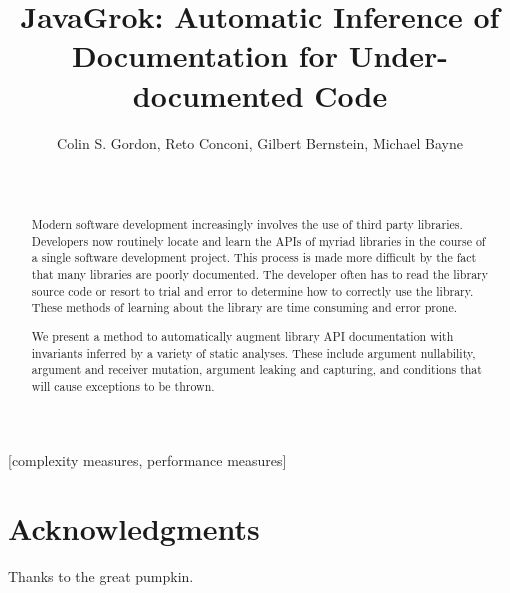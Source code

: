 \documentclass{sig-alternate}
\begin{document}

\title{JavaGrok: Automatic Inference of Documentation for Under-documented Code}

\author{
\alignauthor
Colin S. Gordon, Reto Conconi, Gilbert Bernstein, Michael Bayne\\
       \\
       \\
}

\maketitle
\begin{abstract}
Modern software development increasingly involves the use of third party
libraries. Developers now routinely locate and learn the APIs of myriad
libraries in the course of a single software development project. This process
is made more difficult by the fact that many libraries are poorly documented.
The developer often has to read the library source code or resort to trial and
error to determine how to correctly use the library. These methods of learning
about the library are time consuming and error prone.

We present a method to automatically augment library API documentation with invariants
inferred by a variety of static analyses. These include argument nullability,
argument and receiver mutation, argument leaking and capturing, and conditions
that will cause exceptions to be thrown.
\end{abstract}

[complexity measures, performance measures]













\section{Acknowledgments}
Thanks to the great pumpkin.



\end{document}
